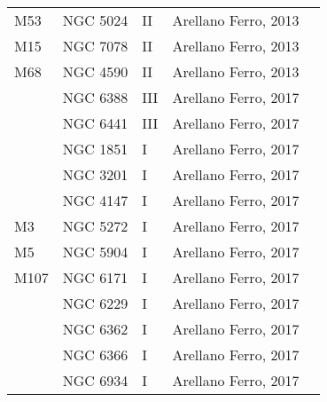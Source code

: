 \documentclass[]{article}
\begin{document}
\begin{longtable}{
	p{1.5cm}|
	p{2.5cm}|
	p{2.5cm}|
	p{3.7cm}|
	p{5.5cm}
	@{}}
		M53            & NGC 5024     & II         & Arellano Ferro, 2013 &                                                                        \\
		M15            & NGC 7078     & II         & Arellano Ferro, 2013 &                                                                        \\
		M68            & NGC 4590     & II         & Arellano Ferro, 2013 &                                                                        \\
		& NGC 6388     & III        & Arellano Ferro, 2017 \cite{arellano_ferro_2017} &                                                                        \\
		& NGC 6441     & III        & Arellano Ferro, 2017 &                                                                        \\
		& NGC 1851     & I          & Arellano Ferro, 2017 &                                                                        \\
		& NGC 3201     & I          & Arellano Ferro, 2017 &                                                                        \\
		& NGC 4147     & I          & Arellano Ferro, 2017 &                                                                        \\
		M3             & NGC 5272     & I          & Arellano Ferro, 2017 &                                                                        \\
		M5             & NGC 5904     & I          & Arellano Ferro, 2017 &                                                                        \\
		M107           & NGC 6171     & I          & Arellano Ferro, 2017 &                                                                        \\
		& NGC 6229     & I          & Arellano Ferro, 2017 &                                                                        \\
		& NGC 6362     & I          & Arellano Ferro, 2017 &                                                                        \\
		& NGC 6366     & I          & Arellano Ferro, 2017 &                                                                        \\
		& NGC 6934     & I          & Arellano Ferro, 2017 &                                                                        \\

\end{longtable}
\end{document}
